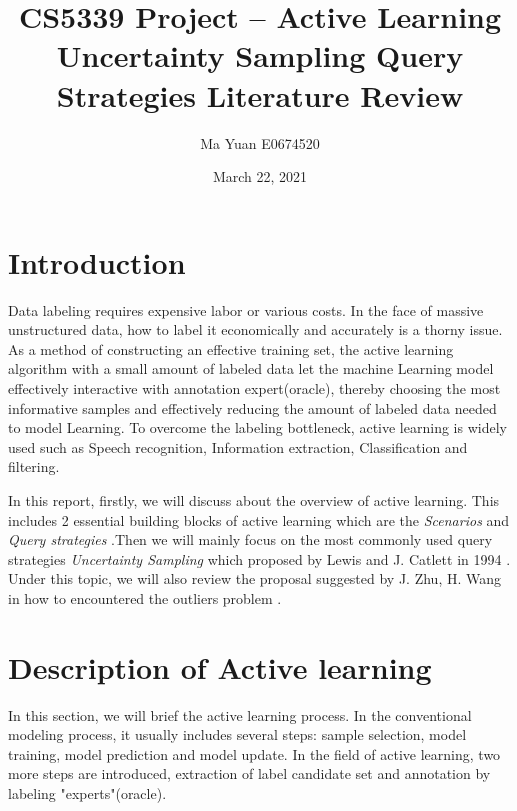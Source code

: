 \documentclass[english,12pt]{article}
\title{%
	CS5339 Project -- Active Learning \\
	\large Uncertainty Sampling Query Strategies Literature Review \\}
\date{March 22, 2021}
\author{Ma Yuan E0674520}
\begin{document}
	\maketitle
	
	\section{Introduction} \label{sec:intro}
	
	Data labeling requires expensive labor or various costs. In the face of massive unstructured data, how to label it economically and accurately is a thorny issue. As a method of constructing an effective training set, the active learning algorithm with a small amount of labeled data let the machine Learning model effectively interactive with annotation expert(oracle), thereby choosing the most informative samples and effectively reducing the amount of labeled data needed to model Learning. To overcome the labeling bottleneck, active learning is widely used such as Speech recognition, Information extraction, Classification and filtering\cite{alSurvey}.
	
	In this report, firstly, we will discuss about the overview of active learning. This includes 2 essential building blocks of active learning which are the {\em Scenarios} and {\em Query strategies} \cite{wiki}.Then we will mainly focus on the most commonly used query strategies {\em Uncertainty Sampling} which proposed by Lewis and J. Catlett in 1994 \cite{LewisandGale1994,alSurvey}. Under this topic, we will also review the proposal suggested by J. Zhu, H. Wang in how to encountered the outliers problem \cite{ALuncertantDense}. 
	
	
	\section{Description of Active learning}
	
	In this section, we will brief the active learning process. In the conventional modeling process, it usually includes several steps: sample selection, model training, model prediction and model update. In the field of active learning, two more steps are introduced, extraction of label candidate set and annotation by labeling "experts"(oracle)\cite{wiki}. 
	
\end{document}
